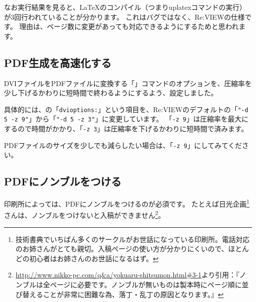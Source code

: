 なお実行結果を見ると、\LaTeX{}のコンパイル（つまりuplatexコマンドの実行）が3回行われていることが分かります。
これはバグではなく、Re:VIEWの仕様です。
理由は、ページ数に変更があっても対応できるようにするためと思われます。

\subsection*{PDF生成を高速化する}
\label{sec:1-3-7}

DVIファイルをPDFファイルに変換する「」コマンドのオプションを、圧縮率を少し下げるかわりに短時間で終わるようにするよう、設定しました。

具体的には、の「\texttt{dvioptions:}」という項目を、Re:VIEWのデフォルトの「\texttt{"{-}d 5 {-}z 9"}」から「\texttt{"{-}d 5 {-}z 3"}」に変更しています。
「\texttt{{-}z 9}」は圧縮率を最大にするので時間がかかり、「\texttt{{-}z 3}」は圧縮率を下げるかわりに短時間で済みます。

PDFファイルのサイズを少しでも減らしたい場合は、「\texttt{{-}z 9}」にしてみてください。

\subsection*{PDFにノンブルをつける}
\label{sec:1-3-8}

印刷所によっては、PDFにノンブルをつけるのが必須です。
たとえば日光企画\footnote{技術書典でいちばん多くのサークルがお世話になっている印刷所。電話対応のお姉さんがとても親切。入稿ページの使い方が分かりにくいので、ほとんどの初心者はお姉さんのお世話になるはず。}さんは、ノンブルをつけないと入稿ができません\footnote{\url{http://www.nikko-pc.com/q&a/yokuaru-shitsumon.html\#3-1}より引用：『ノンブルは全ページに必要です。ノンブルが無いものは製本時にページ順に並び替えることが非常に困難な為、落丁・乱丁の原因となります。』}。

